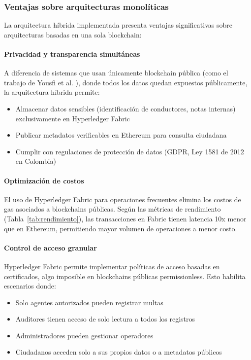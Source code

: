 \subsubsection{Ventajas sobre arquitecturas monolíticas}

La arquitectura híbrida implementada presenta ventajas significativas sobre arquitecturas basadas en una sola blockchain:

\paragraph{Privacidad y transparencia simultáneas}
A diferencia de sistemas que usan únicamente blockchain pública (como el trabajo de Yousfi et al. \parencite{yousfi2019blockchain}), donde todos los datos quedan expuestos públicamente, la arquitectura híbrida permite:
\begin{itemize}
    \item Almacenar datos sensibles (identificación de conductores, notas internas) exclusivamente en Hyperledger Fabric
    \item Publicar metadatos verificables en Ethereum para consulta ciudadana
    \item Cumplir con regulaciones de protección de datos (GDPR, Ley 1581 de 2012 en Colombia)
\end{itemize}

\paragraph{Optimización de costos}
El uso de Hyperledger Fabric para operaciones frecuentes elimina los costos de gas asociados a blockchains públicas. Según las métricas de rendimiento (Tabla~\ref{tab:rendimiento}), las transacciones en Fabric tienen latencia 10x menor que en Ethereum, permitiendo mayor volumen de operaciones a menor costo.

\paragraph{Control de acceso granular}
Hyperledger Fabric permite implementar políticas de acceso basadas en certificados, algo imposible en blockchains públicas permissionless. Esto habilita escenarios donde:
\begin{itemize}
    \item Solo agentes autorizados pueden registrar multas
    \item Auditores tienen acceso de solo lectura a todos los registros
    \item Administradores pueden gestionar operadores
    \item Ciudadanos acceden solo a sus propios datos o a metadatos públicos
\end{itemize}

